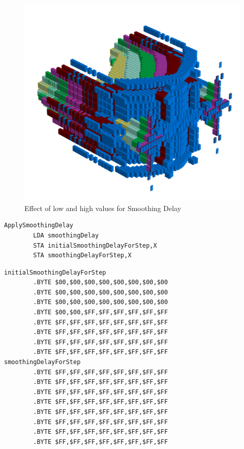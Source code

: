 \begin{figure}[H]
    \begin{adjustbox}{width=10.5cm,margin=0cm -2cm}
      \includegraphics[width=12cm]{src/delay/pattern1-45.png}%
    \end{adjustbox}
    \caption{Effect of low and high values for Smoothing Delay}
\end{figure}
                                                                           
\begin{lstlisting}[caption=From \icode{MainInterruptHandler}.]
ApplySmoothingDelay    
        LDA smoothingDelay
        STA initialSmoothingDelayForStep,X
        STA smoothingDelayForStep,X
\end{lstlisting}

\begin{lstlisting}[caption=Definition of \icode{smoothingDelayForStep} and its counterpart \icode{initialSmoothingDelayForStep}..]
initialSmoothingDelayForStep
        .BYTE $00,$00,$00,$00,$00,$00,$00,$00
        .BYTE $00,$00,$00,$00,$00,$00,$00,$00
        .BYTE $00,$00,$00,$00,$00,$00,$00,$00
        .BYTE $00,$00,$FF,$FF,$FF,$FF,$FF,$FF
        .BYTE $FF,$FF,$FF,$FF,$FF,$FF,$FF,$FF
        .BYTE $FF,$FF,$FF,$FF,$FF,$FF,$FF,$FF
        .BYTE $FF,$FF,$FF,$FF,$FF,$FF,$FF,$FF
        .BYTE $FF,$FF,$FF,$FF,$FF,$FF,$FF,$FF
smoothingDelayForStep
        .BYTE $FF,$FF,$FF,$FF,$FF,$FF,$FF,$FF
        .BYTE $FF,$FF,$FF,$FF,$FF,$FF,$FF,$FF
        .BYTE $FF,$FF,$FF,$FF,$FF,$FF,$FF,$FF
        .BYTE $FF,$FF,$FF,$FF,$FF,$FF,$FF,$FF
        .BYTE $FF,$FF,$FF,$FF,$FF,$FF,$FF,$FF
        .BYTE $FF,$FF,$FF,$FF,$FF,$FF,$FF,$FF
        .BYTE $FF,$FF,$FF,$FF,$FF,$FF,$FF,$FF
        .BYTE $FF,$FF,$FF,$FF,$FF,$FF,$FF,$FF
\end{lstlisting}


